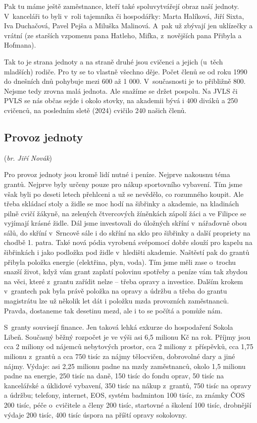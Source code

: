 \documentclass[a5paper, 12pt, twoside]{article}
\begin{document}
Pak tu máme ještě zaměstnance, kteří také spoluvytvářejí obraz naší
jednoty. V~kanceláři to byli v~roli tajemníka či hospodářky: Marta
Halíková, Jiří Sixta, Iva Duchačová, Pavel Pejša a Miluška Malinová.
A~pak už zbývají jen uklízečky a vrátní (ze starších vzpomenu pana
Hatleho, Mifka, z~novějších pana Přibyla a Hofmana).

Tak to je strana jednoty a na straně druhé jsou cvičenci a jejich
(u~těch mladších) rodiče. Pro ty se to vlastně všechno děje. Počet členů se
od roku 1990 do dnešních dnů pohybuje mezi 600 až 1 000. V~současnosti
je to přibližně 800. Nejsme tedy zrovna malá jednota. Ale snažíme se
držet pospolu. Na JVLS či PVLS se nás občas sejde i okolo stovky, na
akademii bývá i 400 diváků a 250 cvičenců, na posledním sletě (2024)
cvičilo 240 našich členů.

\subsection{Provoz jednoty}

(\textit{br. Jiří Novák})

Pro provoz jednoty jsou kromě lidí nutné i peníze. Nejprve nakousnu téma
grantů. Nejprve byly určeny pouze pro nákup sportovního vybavení. Tím
jsme však byli po deseti letech přehlceni a už se nevědělo, co rozumného
koupit. Ale třeba skládací stoly a židle se moc hodí na šibřinky a
akademie, na kladinách pilně cvičí žákyně, na zelených čtvercových
žíněnkách zápolí žáci a ve Filipce se vyjímají krásné židle. Dál jsme
investovali do úložných skříní v~nářaďovně obou sálů, do skříní
v~Srncově sále i do skříní na sklo pro šibřinky a další propriety na
chodbě 1. patra. Také nová pódia vyrobená svépomocí dobře slouží pro
kapelu na šibřinkách i jako podložka pod židle v~hledišti akademie.
Naštěstí pak do grantů přibyla položka energie (elektřina, plyn, voda).
Tím jsme měli zase o~trochu snazší život, když vám grant zaplatí
polovinu spotřeby a peníze vám tak zbydou na věci, které z~grantu
zařídit nelze -- třeba opravy a investice. Dalším krokem v~grantech pak
byla právě položka na opravy a údržbu a třeba do grantu magistrátu lze
už několik let dát i položku mzda provozních zaměstnanců. Pravda,
dostaneme tak desetinu mezd, ale i to se počítá a pomůže nám.

S~granty souvisejí finance. Jen taková lehká exkurze do hospodaření
Sokola Libeň. Současný běžný rozpočet je ve výši asi 6,5 milionu Kč na
rok. Příjmy jsou cca 2 miliony od nájemců nebytových prostor, cca 2
miliony z~příspěvků, cca 1,75 milionu z~grantů a cca 750 tisíc za nájmy
tělocvičen, dobrovolné dary a jiné nájmy. Výdaje: asi 2,25 milionu padne
na mzdy zaměstnanců, okolo 1,5 milionu padne na energie, 250 tisíc na
daně, 150 tisíc do fondu oprav, 50 tisíc na kancelářské a úklidové
vybavení, 350 tisíc na nákup z~grantů, 750 tisíc na opravy a údržbu;
telefony, internet, EOS, systém badminton 100 tisíc, za známky ČOS 200
tisíc, péče o~cvičitele a členy 200 tisíc, startovné a školení 100
tisíc, drobnější výdaje 200 tisíc, 400 tisíc úspora na příští opravy
sokolovny.
\end{document}
